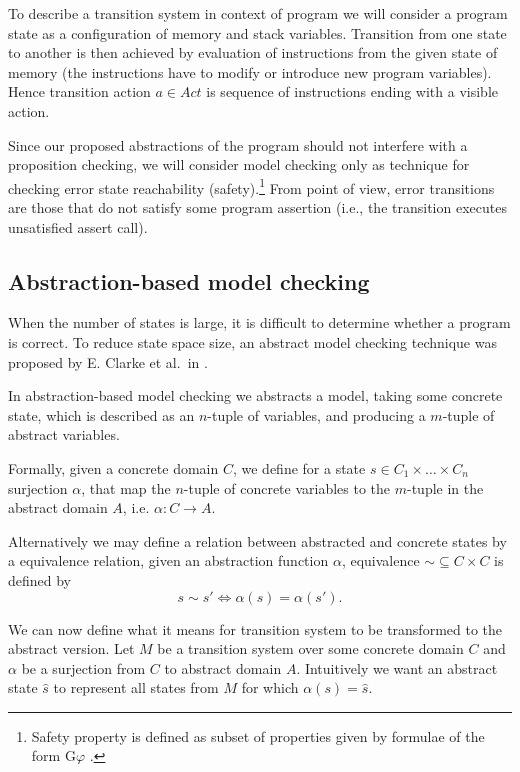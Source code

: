 To describe a transition system in context of \LLVM program we
will consider a program state as a configuration of memory and stack variables.
Transition from one state to another is then achieved by evaluation of \LLVM
instructions from the given state of memory (the instructions have to modify or
introduce new program variables). Hence transition action $a \in Act$ is sequence
of \LLVM instructions ending with a visible action.


Since our proposed abstractions of the program should not interfere with a
proposition checking, we will consider model checking only as technique for
checking error state reachability (safety).\footnote{Safety property is defined
as subset of \LTL properties given by formulae of the form
$\mathrm{G}\varphi$ \cite{Manna92}.} From \LLVM point of view, error
transitions are those that do not satisfy some program assertion (i.e., the
transition executes unsatisfied assert call).

\subsection{Abstraction-based model checking} \label{subsec:amc}

When the number of states is large, it is difficult to determine whether a program
is correct. To reduce state space size, an abstract model checking technique was proposed
by E. Clarke et al.~in \cite{Clarke94}.

In abstraction-based model checking we abstracts a model, taking some concrete state,
which is described as an $n$-tuple of variables, and producing a $m$-tuple of abstract
variables.

Formally, given a concrete domain $C$, we define for a state $s \in C_1 \times \dots \times C_n$
surjection $\alpha$, that map the $n$-tuple of concrete variables to the $m$-tuple in the abstract domain
$A$, i.e. $\alpha : C \rightarrow A$.

Alternatively we may define a relation between abstracted and concrete states
by a equivalence relation, given an abstraction function $\alpha$, equivalence
${\sim} \subseteq C \times C$ is defined by
\[s  \sim s' \iff \alpha(s) = \alpha(s').\]

We can now define what it means for transition system to be transformed to
the abstract version. Let $M$ be a transition system over some concrete domain $C$ and
$\alpha$ be a surjection from $C$ to abstract domain $A$. Intuitively we want an
abstract state $\widehat{s}$ to represent all states from $M$ for which $\alpha(s) =
\widehat{s}$.

